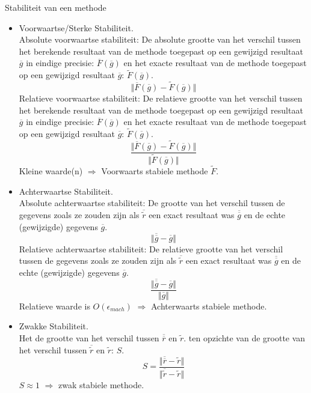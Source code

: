 \documentclass[samenvatting.tex]{subfiles}
\begin{document}
\begin{defi}
Stabiliteit van een methode\\
\begin{itemize}
\item Voorwaartse/Sterke Stabiliteit.\\
Absolute voorwaartse stabiliteit:
De absolute grootte van het verschil tussen het berekende resultaat van de methode toegepast op een gewijzigd resultaat $\overline{g}$ in eindige precisie: $\overline{F}(\overline{g})$ en het exacte resultaat van de methode toegepast op een gewijzigd resultaat $\overline{g}$: $\widetilde{F}(\overline{g})$.
\[
\Vert \overline{F}(\overline{g}) - \widetilde{F}(\overline{g}) \Vert
\]
Relatieve voorwaartse stabiliteit:
De relatieve grootte van het verschil tussen het berekende resultaat van de methode toegepast op een gewijzigd resultaat $\overline{g}$ in eindige precisie: $\overline{F}(\overline{g})$ en het exacte resultaat van de methode toegepast op een gewijzigd resultaat $\overline{g}$: $\widetilde{F}(\overline{g})$.
\[
\frac{\Vert \overline{F}(\overline{g}) - \widetilde{F}(\overline{g}) \Vert}{\Vert \widetilde{F}(\overline{g}) \Vert}
\]
Kleine waarde(n) $\Rightarrow$ Voorwaarts stabiele methode $\widetilde{F}$.

\item Achterwaartse Stabiliteit.\\
Absolute achterwaartse stabiliteit: De grootte van het verschil tussen de gegevens zoals ze zouden zijn als $\overline{\widetilde{r}}$ een exact resultaat was $\overline{\overline{g}}$ en de echte (gewijzigde) gegevens $\overline{g}$. 
\[
\Vert \overline{\overline{g}} - \overline{g} \Vert
\]
Relatieve achterwaartse stabiliteit: De relatieve grootte van het verschil tussen de gegevens zoals ze zouden zijn als $\overline{\widetilde{r}}$ een exact resultaat was $\overline{\overline{g}}$ en de echte (gewijzigde) gegevens $\overline{g}$. 
\[
\frac{\Vert \overline{\overline{g}} - \overline{g} \Vert}{\Vert \overline{g} \Vert}
\]
Relatieve waarde is $O(\epsilon_{mach})$ $\Rightarrow$ Achterwaarts stabiele methode.

\item Zwakke Stabiliteit.\\
Het de grootte van het verschil tussen $\overline{\overline{r}}$ en $\widetilde{r}$. ten opzichte van de grootte van het verschil tussen $\overline{\widetilde{r}}$ en $\widetilde{r}$: $S$.
\[
S =
\frac
{\Vert \overline{\overline{r}} - \widetilde{r} \Vert}
{\Vert \overline{\widetilde{r}} - \widetilde{r}\Vert}
\]
$S \approx 1$ $\Rightarrow$ zwak stabiele methode.
\end{itemize}
\end{defi}
\end{document}
